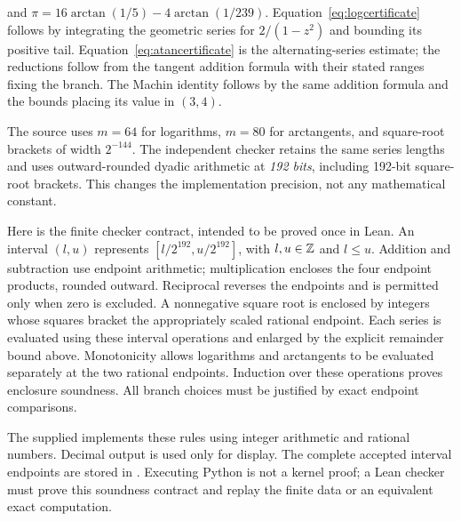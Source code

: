 \]
and $\pi=16\arctan(1/5)-4\arctan(1/239)$.
Equation~\eqref{eq:logcertificate} follows by integrating the geometric
series for $2/(1-z^2)$ and bounding its positive tail.
Equation~\eqref{eq:atancertificate} is the alternating-series estimate;
the reductions follow from the tangent addition formula with their
stated ranges fixing the branch. The Machin identity follows by the
same addition formula and the bounds placing its value in $(3,4)$.

The source uses $m=64$ for logarithms, $m=80$ for arctangents, and
square-root brackets of width $2^{-144}$. The independent checker
retains the same series lengths and uses outward-rounded dyadic
arithmetic at \emph{192 bits}, including 192-bit square-root brackets.
This changes the implementation precision, not any mathematical constant.

Here is the finite checker contract, intended to be proved once in
Lean. An interval $(l,u)$ represents $[l/2^{192},u/2^{192}]$, with
$l,u\in\mathbb Z$ and $l\le u$. Addition and subtraction use endpoint arithmetic;
multiplication encloses the four endpoint products, rounded outward.
Reciprocal reverses the endpoints and is permitted only when zero is
excluded. A nonnegative square root is enclosed by integers whose
squares bracket the appropriately scaled rational endpoint. Each series
is evaluated using these interval operations and enlarged by the
explicit remainder bound above. Monotonicity allows logarithms and
arctangents to be evaluated separately at the two rational endpoints.
Induction over these operations proves enclosure soundness. All branch
choices must be justified by exact endpoint comparisons.

The supplied  implements these rules
using integer arithmetic and rational numbers. Decimal output is used
only for display. The complete accepted interval endpoints are stored
in . Executing Python is
not a kernel proof; a Lean checker must prove this soundness contract
and replay the finite data or an equivalent exact computation.

